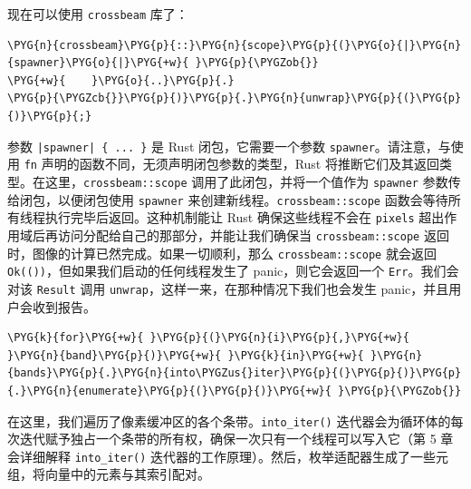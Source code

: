 现在可以使用 \texttt{crossbeam} 库了：

\begin{Verbatim}[commandchars=\\\{\},breaklines=true,breakanywhere=true,fontsize=\codefont,xleftmargin=17bp]
\PYG{n}{crossbeam}\PYG{p}{::}\PYG{n}{scope}\PYG{p}{(}\PYG{o}{|}\PYG{n}{spawner}\PYG{o}{|}\PYG{+w}{ }\PYG{p}{\PYGZob{}}
\PYG{+w}{    }\PYG{o}{..}\PYG{p}{.}
\PYG{p}{\PYGZcb{}}\PYG{p}{)}\PYG{p}{.}\PYG{n}{unwrap}\PYG{p}{(}\PYG{p}{)}\PYG{p}{;}
\end{Verbatim}

参数 \texttt{|spawner| \{ ... \}} 是 Rust 闭包，它需要一个参数 \texttt{spawner}。请注意，与使用 \texttt{fn} 声明的函数不同，无须声明闭包参数的类型，Rust 将推断它们及其返回类型。在这里，\texttt{crossbeam::scope} 调用了此闭包，并将一个值作为 \texttt{spawner} 参数传给闭包，以便闭包使用 \texttt{spawner} 来创建新线程。\texttt{crossbeam::scope} 函数会等待所有线程执行完毕后返回。这种机制能让 Rust 确保这些线程不会在 \texttt{pixels} 超出作用域后再访问分配给自己的那部分，并能让我们确保当 \texttt{crossbeam::scope} 返回时，图像的计算已然完成。如果一切顺利，那么 \texttt{crossbeam::scope} 就会返回 \texttt{Ok(())}，但如果我们启动的任何线程发生了 panic，则它会返回一个 \texttt{Err}。我们会对该 \texttt{Result} 调用 \texttt{unwrap}，这样一来，在那种情况下我们也会发生 panic，并且用户会收到报告。

\begin{Verbatim}[commandchars=\\\{\},breaklines=true,breakanywhere=true,fontsize=\codefont,xleftmargin=17bp]
\PYG{k}{for}\PYG{+w}{ }\PYG{p}{(}\PYG{n}{i}\PYG{p}{,}\PYG{+w}{ }\PYG{n}{band}\PYG{p}{)}\PYG{+w}{ }\PYG{k}{in}\PYG{+w}{ }\PYG{n}{bands}\PYG{p}{.}\PYG{n}{into\PYGZus{}iter}\PYG{p}{(}\PYG{p}{)}\PYG{p}{.}\PYG{n}{enumerate}\PYG{p}{(}\PYG{p}{)}\PYG{+w}{ }\PYG{p}{\PYGZob{}}
\end{Verbatim}

在这里，我们遍历了像素缓冲区的各个条带。\texttt{into\_iter()} 迭代器会为循环体的每次迭代赋予独占一个条带的所有权，确保一次只有一个线程可以写入它（第 5 章会详细解释 \texttt{into\_iter()} 迭代器的工作原理）。然后，枚举适配器生成了一些元组，将向量中的元素与其索引配对。

